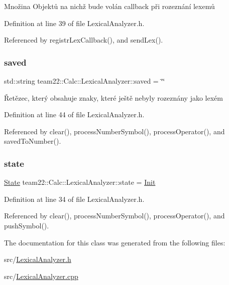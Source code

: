 Množina Objektů na nichž bude volán callback při rozeznání lexemů 

Definition at line 39 of file Lexical\+Analyzer.\+h.



Referenced by registr\+Lex\+Callback(), and send\+Lex().

\mbox{\label{classteam22_1_1_calc_1_1_lexical_analyzer_afd063de2c3d792b5688c863eb5135968}} 
\subsubsection{\texorpdfstring{saved}{saved}}
{\footnotesize\ttfamily std\+::string team22\+::\+Calc\+::\+Lexical\+Analyzer\+::saved = \char`\"{}\char`\"{}\hspace{0.3cm}{\ttfamily [private]}}

Řetězec, který obsahuje znaky, které ještě nebyly rozeznány jako lexém 

Definition at line 44 of file Lexical\+Analyzer.\+h.



Referenced by clear(), process\+Number\+Symbol(), process\+Operator(), and saved\+To\+Number().

\mbox{\label{classteam22_1_1_calc_1_1_lexical_analyzer_ad0f4710b09bf91a00d11846a7ef036ab}} 
\subsubsection{\texorpdfstring{state}{state}}
{\footnotesize\ttfamily \hyperlink{classteam22_1_1_calc_1_1_lexical_analyzer_aef11ba66454715a80d5964c07f6d8cc3}{State} team22\+::\+Calc\+::\+Lexical\+Analyzer\+::state = \hyperlink{classteam22_1_1_calc_1_1_lexical_analyzer_aef11ba66454715a80d5964c07f6d8cc3a11976214c837f23fd71b2af8b0de3d5b}{Init}\hspace{0.3cm}{\ttfamily [private]}}



Definition at line 34 of file Lexical\+Analyzer.\+h.



Referenced by clear(), process\+Number\+Symbol(), process\+Operator(), and push\+Symbol().



The documentation for this class was generated from the following files\+:\begin{DoxyCompactItemize}
\item 
src/\hyperlink{_lexical_analyzer_8h}{Lexical\+Analyzer.\+h}\item 
src/\hyperlink{_lexical_analyzer_8cpp}{Lexical\+Analyzer.\+cpp}\end{DoxyCompactItemize}
